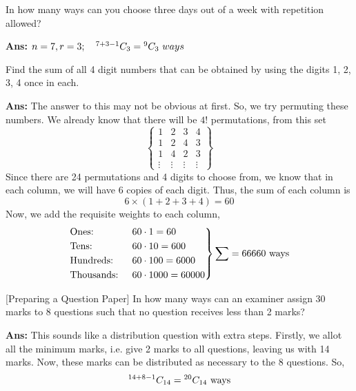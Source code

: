 \begin{example}
    In how many ways can you choose three days out of a week with repetition allowed?

    \textbf{Ans:} \mbox{$n=7,r=3;\quad {}^{7+3-1}C_{3} = {}^{9}C_{3}\ ways$}
\end{example}

\begin{example}
    Find the sum of all 4 digit numbers that can be obtained by using the digits 1, 2, 3, 4 once in each.

    \textbf{Ans:} The answer to this may not be obvious at first. So, we try permuting these numbers. We already know that there will be \mbox{$4!$} permutations, from this set
    \[
        \begin{Bmatrix}
            1      & 2      & 3      & 4      \\
            1      & 2      & 4      & 3      \\
            1      & 4      & 2      & 3      \\
            \vdots & \vdots & \vdots & \vdots
        \end{Bmatrix}
    \]
    Since there are 24 permutations and 4 digits to choose from, we know that in each column, we will have 6 copies of each digit. Thus, the sum of each column is
    \[
        6\times(1+2+3+4) = 60
    \]
    Now, we add the requisite weights to each column,
    \[
        \begin{rcases}
            \text{Ones: }      & 60 \cdot 1 = 60       \\
            \text{Tens: }      & 60 \cdot 10 = 600     \\
            \text{Hundreds: }  & 60 \cdot 100 = 6000   \\
            \text{Thousands: } & 60 \cdot 1000 = 60000
        \end{rcases} \sum = 66660 \text{ ways}
    \]
\end{example}

\begin{example} \label{ex:preparing_a_qp}
    [Preparing a Question Paper]
    In how many ways can an examiner assign 30 marks to 8 questions such that no question receives less than 2 marks?

    \textbf{Ans:} This sounds like a distribution question with extra steps. Firstly, we allot all the minimum marks, i.e. give 2 marks to all questions, leaving us with 14 marks. Now, these marks can be distributed as necessary to the 8 questions. So,
    \[
        {}^{14+8-1}C_{14} = {}^{20}C_{14} \text{ ways}
    \]
\end{example}

